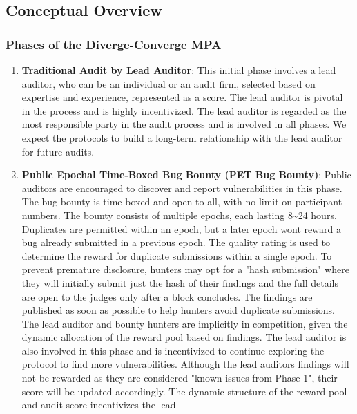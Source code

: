 \documentclass[10pt]{extarticle}
\begin{document}
\subsection{ Conceptual Overview}\label{41-conceptual-overview}

\subsubsection{ Phases of the Diverge-Converge
MPA}\label{411-phases-of-the-diverge-converge-mpa}

\begin{enumerate}
\def\labelenumi{\arabic{enumi}.}
\item
  \textbf{Traditional Audit by Lead Auditor}: This initial phase
  involves a lead auditor, who can be an individual or an audit firm,
  selected based on expertise and experience, represented as a score.
  The lead auditor is pivotal in the process and is highly incentivized.
  The lead auditor is regarded as the most responsible party in the
  audit process and is involved in all phases. We expect the protocols
  to build a long-term relationship with the lead auditor for future
  audits.
\item
  \textbf{Public Epochal Time-Boxed Bug Bounty (PET Bug Bounty)}: Public
  auditors are encouraged to discover and report vulnerabilities in this
  phase. The bug bounty is time-boxed and open to all, with no limit on
  participant numbers. The bounty consists of multiple epochs, each
  lasting 8\textasciitilde24 hours. Duplicates are permitted within an
  epoch, but a later epoch won\textquotesingle t reward a bug already
  submitted in a previous epoch. The quality rating is used to determine
  the reward for duplicate submissions within a single epoch. To prevent
  premature disclosure, hunters may opt for a "hash submission" where
  they will initially submit just the hash of their findings and the
  full details are open to the judges only after a block concludes. The
  findings are published as soon as possible to help hunters avoid
  duplicate submissions. The lead auditor and bounty hunters are
  implicitly in competition, given the dynamic allocation of the reward
  pool based on findings. The lead auditor is also involved in this
  phase and is incentivized to continue exploring the protocol to find
  more vulnerabilities. Although the lead auditor\textquotesingle s
  findings will not be rewarded as they are considered "known issues
  from Phase 1", their score will be updated accordingly. The dynamic
  structure of the reward pool and audit score incentivizes the lead

\end{enumerate}
\end{document}
